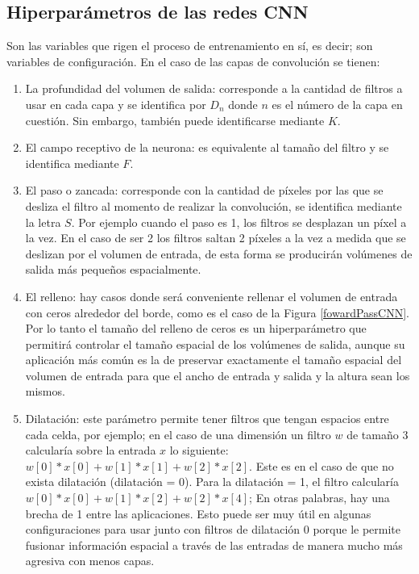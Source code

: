 \subsection{Hiperparámetros de las redes CNN}
Son las variables que rigen el proceso de entrenamiento en sí, es decir; son variables de configuración. En el caso de las capas de convolución se tienen:
\begin{enumerate}
    \item La profundidad del volumen de salida: corresponde a la cantidad de filtros a usar en cada capa y se identifica por $D_{n}$ donde $n$ es el número de la capa en cuestión. Sin embargo, también puede identificarse mediante $K$.
    \item El campo receptivo de la neurona: es equivalente al tamaño del filtro y se identifica mediante $F$.
    \item El paso o zancada: corresponde con la cantidad de píxeles por las que se desliza el filtro al momento de realizar la convolución, se identifica mediante la letra $S$. Por ejemplo cuando el paso es 1, los filtros se desplazan un píxel a la vez. En el caso de ser 2 los filtros saltan 2 píxeles a la vez a medida que se deslizan por el volumen de entrada, de esta forma se producirán volúmenes de salida más pequeños espacialmente.
    \item El relleno: hay casos donde será conveniente rellenar el volumen de entrada con ceros alrededor del borde, como es el caso de la Figura \ref{fowardPassCNN}. Por lo tanto el tamaño del relleno de ceros es un hiperparámetro que  permitirá controlar el tamaño espacial de los volúmenes de salida, aunque su aplicación más común es la de preservar exactamente el tamaño espacial del volumen de entrada para que el ancho de entrada y salida y la altura sean los mismos.
    \item Dilatación: este parámetro permite tener filtros que tengan espacios entre cada celda, por ejemplo; en el caso de una dimensión un filtro $w$ de tamaño 3 calcularía sobre la entrada $x$ lo siguiente: $w [0] * x [0] + w [1] * x [1] + w [2] * x [2]$. Este es en el caso de que no exista dilatación (dilatación = 0). Para la dilatación = 1, el filtro calcularía $w [0] * x [0] + w [1] * x [2] + w [2] * x [4]$; En otras palabras, hay una brecha de 1 entre las aplicaciones.  Esto puede ser muy útil en algunas configuraciones para usar junto con filtros de dilatación 0 porque le permite fusionar información espacial a través de las entradas de manera mucho más agresiva con menos capas.
\end{enumerate}
